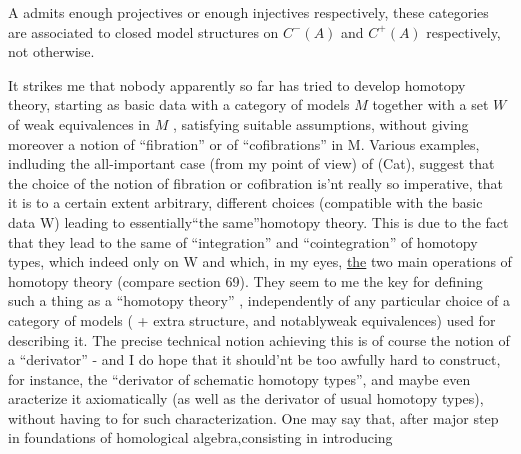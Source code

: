 
A admits enough projectives or enough injectives respectively,  these
categories are associated to closed model structures on $C^{-}(A)$ and $C^{+}(A)$
respectively,    not otherwise.

It strikes me that nobody apparently so far has tried to develop
homotopy theory,  starting as basic data with a category of models  $M$
together with a set $W$ of weak equivalences in $M$ ,  satisfying suitable
assumptions,  without giving moreover a notion of ``fibration'' or of
``cofibrations'' in M.  Various examples,   indluding the all-important
case (from my point of view) of (Cat),  suggest that the choice of the
notion of fibration or cofibration is'nt really so imperative,  that it
is to a certain extent arbitrary,  different choices (compatible with the
basic data W) leading to essentially\hand{/}``the same''\hand{/}homotopy theory.  This 
is due to the fact that they lead to the same  of ``integration'' and
``cointegration'' of homotopy types,  which  indeed only on W and
which,  in my eyes,   \uline{the} two main operations of homotopy theory
(compare section 69).  They seem to me the key for defining such a thing
as a  ``homotopy theory'' ,  independently of any particular choice of
a category of models ( + extra structure, and notably\hand{,}weak equivalences)
used for describing it.  The precise technical notion achieving this is
of course the notion of a ``derivator'' - and I do hope that it should'nt
be too awfully hard to construct,  for instance,  the ``derivator of
schematic homotopy types'',  and maybe even aracterize it axiomatically
(as well as the derivator of usual homotopy types),  without having to
 for such characterization.  One may say that,  after   major
step in  foundations of homological algebra,\hand{|}consisting in introducing 
